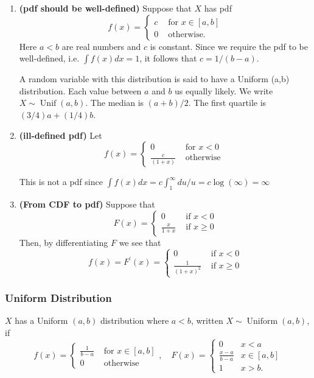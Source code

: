 \documentclass[13pt]{article}
\theoremstyle{definition}
\theoremstyle{remark}
\newenvironment{remark}
  {\pushQED{\qed}\renewcommand{\qedsymbol}{$\triangle$}\remarkx}
  {\popQED\endremarkx}
\begin{document}
\begin{remark}\hfill
    \begin{enumerate}
        \item \textbf{(pdf should be well-defined)} Suppose that $X$ has pdf
\[
f(x)= \begin{cases}c & \text { for } x \in[a, b] \\ 0 & \text { otherwise. }\end{cases}
\]
Here $a<b$ are real numbers and $c$ is constant. Since we require the pdf to be  well-defined, i.e. $\int f(x) d x=1$, it follows that $c=1 /(b-a)$. 

A random variable with this distribution is said to have a Uniform (a,b) distribution. Each value between $a$ and $b$ us equally likely. We write $X \sim \operatorname{Unif}(a, b)$. The median is $(a+b) / 2$. The first quartile is $(3 / 4) a+(1 / 4) b$.
\item \textbf{(ill-defined pdf)} Let
\[
f(x)= \begin{cases}0 & \text { for } x<0 \\ \frac{c}{(1+x)} & \text { otherwise }\end{cases}
\]

This is not a pdf since $\int f(x) d x=c \int_{1}^{\infty} d u / u=c \log (\infty)=\infty$
\item \textbf{(From CDF to pdf)} Suppose that
\[
F(x)= \begin{cases}0 & \text { if } x<0 \\ \frac{x}{1+x} & \text { if } x \geq 0\end{cases}
\]
Then, by differentiating $F$ we see that
\[
f(x)=F^{\prime}(x)= \begin{cases}0 & \text { if } x<0 \\ \frac{1}{(1+x)^{2}} & \text { if } x \geq 0\end{cases}
\]
    \end{enumerate}
\end{remark}

\subsubsection{Uniform Distribution} $X$ has a Uniform $(a, b)$ distribution where $a<b$, written $X \sim \operatorname{Uniform}(a, b)$, if
\[
f(x)= \begin{cases}\frac{1}{b-a} & \text { for } x \in[a, b] \\ 0 & \text { otherwise }\end{cases}, \quad F(x)= \begin{cases}0 & x<a \\ \frac{x-a}{b-a} & x \in[a, b] \\ 1 & x>b .\end{cases} 
\]
\end{document}
